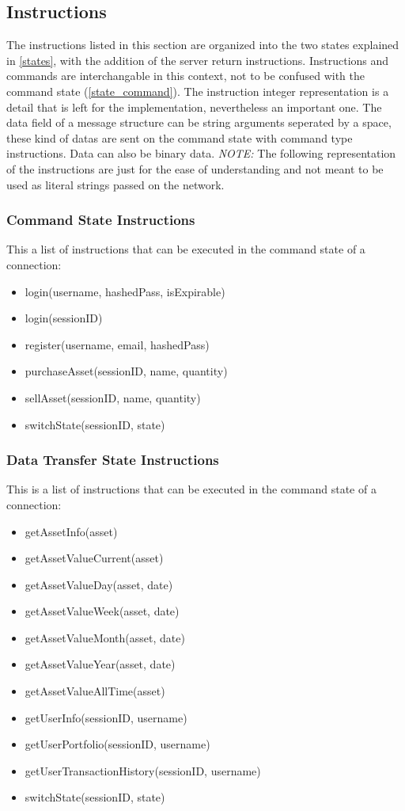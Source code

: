 \documentclass[a4paper]{article}
\begin{document}
\subsection{Instructions}
\label{instructions}
The instructions listed in this section are organized into the two states 
explained in \ref{states}, with the addition of the server return instructions.
Instructions and commands are interchangable in this context, not to be 
confused with the command state (\ref{state_command}). The instruction integer 
representation is a detail that is left for the implementation, nevertheless an
important one. The data field of a message structure can be string arguments 
seperated by a space, these kind of datas are sent on the command state with 
command type instructions. Data can also be binary data. \emph{NOTE:} The 
following representation of the instructions are just for the ease of 
understanding and not meant to be used as literal strings passed on the 
network.

\subsubsection{Command State Instructions}
This a list of instructions that can be executed in the command state of a
connection:
\begin{itemize}
	\item login(username, hashedPass, isExpirable)
	\item login(sessionID)
	\item register(username, email, hashedPass)
	\item purchaseAsset(sessionID, name, quantity)
	\item sellAsset(sessionID, name, quantity)
	\item switchState(sessionID, state)
\end{itemize}

\subsubsection{Data Transfer State Instructions}
This is a list of instructions that can be executed in the command state of a
connection:
\begin{itemize}
	\item getAssetInfo(asset)
	\item getAssetValueCurrent(asset)
	\item getAssetValueDay(asset, date)
	\item getAssetValueWeek(asset, date)
	\item getAssetValueMonth(asset, date)
	\item getAssetValueYear(asset, date)
	\item getAssetValueAllTime(asset)
	\item getUserInfo(sessionID, username)
	\item getUserPortfolio(sessionID, username)
	\item getUserTransactionHistory(sessionID, username)
	\item switchState(sessionID, state)
\end{itemize}
\end{document}
